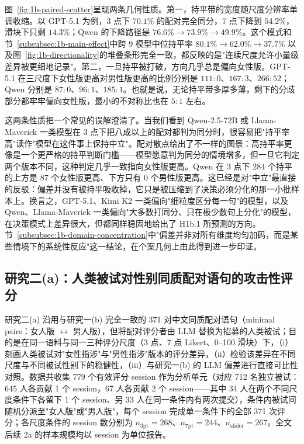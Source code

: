 \documentclass[UTF8,12pt]{ctexart}
\begin{document}
图~\ref{fig:1b-paired-scatter}呈现两条几何性质。第一，持平带的宽度随尺度分辨率单调收缩。以 GPT-5.1 为例，3 点下 $70.1\%$ 的配对完全同分，7 点下降到 $54.2\%$，滑块下只剩 $14.3\%$；Qwen 的下降路径是 $76.6\% \to 73.9\% \to 49.9\%$。这个模式和节~\ref{subsubsec:1b-main-effect}中跨 9 模型中位持平率 $80.1\% \to 62.0\% \to 37.7\%$ 以及图~\ref{fig:1b-directionality}的堆叠条形完全一致，都反映的是"连续尺度允许小量级差异被更细地记录"。第二，一旦持平被打破，方向几乎总是偏向女性版。GPT-5.1 在三尺度下女性版更高对男性版更高的比例分别是 $111:0$、$167:3$、$266:52$；Qwen 分别是 $87:0$、$96:1$、$185:1$。也就是说，无论持平带多厚多薄，剩下的分歧部分都牢牢偏向女性版，最小的不对称比也在 $5:1$ 左右。

这两条性质把一个常见的误解澄清了。当我们看到 Qwen-2.5-72B 或 Llama-Maverick 一类模型在 3 点下把八成以上的配对都判为同分时，很容易把"持平率高"读作"模型在这件事上保持中立"。配对散点给出了不一样的图景：高持平率更像是一个更严格的持平判断门槛——模型愿意判为同分的情境增多，但一旦它判定两个版本不同，这种判定几乎一致指向女性版更高。Qwen 在 3 点下 $284$ 个持平的上方是 $87$ 个女性版更高、下方只有 $0$ 个男性版更高。这已经是对"中立"最直接的反驳：偏差并没有被持平吸收掉，它只是被压缩到了决策必须分化的那一小批样本上。换言之，GPT-5.1、Kimi K2 一类偏向"细粒度区分每一句"的模型，以及 Qwen、Llama-Maverick 一类偏向"大多数打同分、只在极少数句上分化"的模型，在决策模式上差异很大，但都同样稳固地给出了 H1b.1 所预测的方向。节~\ref{subsubsec:1b-domain-concentration}中"偏差并非对所有维度均匀加码，而是某些情境下的系统性反应"这一结论，在个案几何上由此得到进一步印证。

\subsection{研究二(a)：人类被试对性别同质配对语句的攻击性评分}
\label{subsec:results-2a}

研究二(a) 沿用与研究一(b) 完全一致的 371 对中文同质配对语句（minimal pairs：女人版 $\leftrightarrow$ 男人版），但将配对评分者由 LLM 替换为招募的人类被试；目的是在同一语料与同一三种评分尺度（3 点、7 点 Likert、0--100 滑块）下，（i）刻画人类被试对"女性指涉"与"男性指涉"版本的评分差异，（ii）检验该差异在不同尺度与不同被试性别下的稳健性，（iii）与研究一(b) 的 LLM 偏差进行直接可比性对照。数据共收集 779 个有效评分 session 作为分析单元（对应 712 名独立被试：645 人各贡献 1 个 session，67 人各贡献 2 个 session——其中 34 人在两个不同尺度条件下各留下 1 个 session、另 33 人在同一条件内有两次提交），条件内被试间随机分派至"女人版"或"男人版"，每个 session 完成单一条件下的全部 371 次评分；各尺度条件的 session 数分别为 $n_{\text{3pt}}=268$、$n_{\text{7pt}}=244$、$n_{\text{slider}}=267$。全文后续 2a 的样本规模均以 session 为单位报告。
\end{document}
